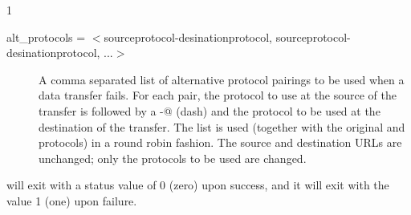 \begin{ManPage}{\label{man-stork-submit}}{1}
\begin{description}
\item[alt\_protocols = $<$sourceprotocol-desinationprotocol, sourceprotocol-desinationprotocol, ...$>$]
A comma separated list of alternative protocol pairings to be used
when a data transfer fails.
For each pair, the protocol to use at the source of the transfer
is followed by a \verb@-@ (dash) and the protocol to be used
at the destination of the transfer.
The list is used
(together with the original 
and  protocols)
in a round robin fashion.
The source and destination URLs are unchanged;
only the protocols to be used are changed.


\end{description}


\begin{Options}
  \ToolArgsBaseDesc
  \StorknameDesc
\end{Options}

\ExitStatus

 will exit with a status value of 0 (zero) upon success,
and it will exit with the value 1 (one) upon failure.

\end{ManPage}
